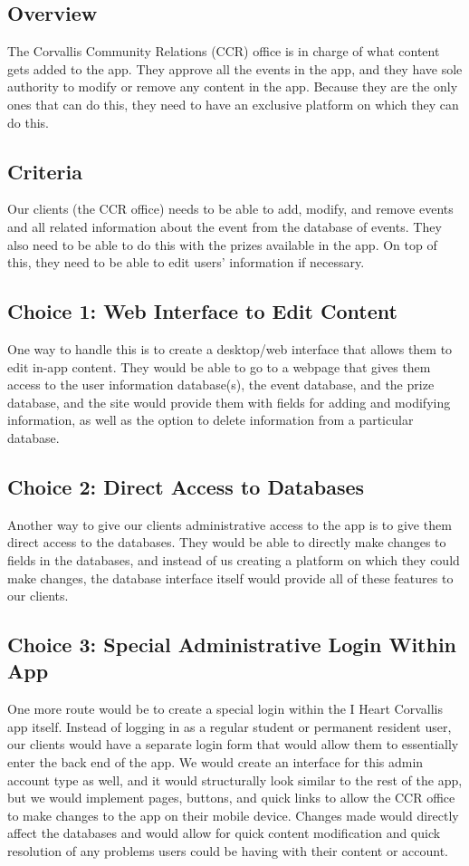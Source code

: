 \documentclass[draftclsnofoot, onecolumn, 10pt, compsoc]{IEEEtran}
\begin{document}
		\subsection{Overview}
			The Corvallis Community Relations (CCR) office is in charge of what content gets added to the app. They approve all the events in the app, and they have sole authority to modify or remove any content in the app. Because they are the only ones that can do this, they need to have an exclusive platform on which they can do this.
		\subsection{Criteria}
			Our clients (the CCR office) needs to be able to add, modify, and remove events and all related information about the event from the database of events. They also need to be able to do this with the prizes available in the app. On top of this, they need to be able to edit users' information if necessary.
		\subsection{Choice 1: Web Interface to Edit Content}
			One way to handle this is to create a desktop/web interface that allows them to edit in-app content. They would be able to go to a webpage that gives them access to the user information database(s), the event database, and the prize database, and the site would provide them with fields for adding and modifying information, as well as the option to delete information from a particular database.
		\subsection{Choice 2: Direct Access to Databases}
			Another way to give our clients administrative access to the app is to give them direct access to the databases. They would be able to directly make changes to fields in the databases, and instead of us creating a platform on which they could make changes, the database interface itself would provide all of these features to our clients.
		\subsection{Choice 3: Special Administrative Login Within App}
			One more route would be to create a special login within the I Heart Corvallis app itself. Instead of logging in as a regular student or permanent resident user, our clients would have a separate login form that would allow them to essentially enter the back end of the app. We would create an interface for this admin account type as well, and it would structurally look similar to the rest of the app, but we would implement pages, buttons, and quick links to allow the CCR office to make changes to the app on their mobile device. Changes made would directly affect the databases and would allow for quick content modification and quick resolution of any problems users could be having with their content or account.
\end{document}
